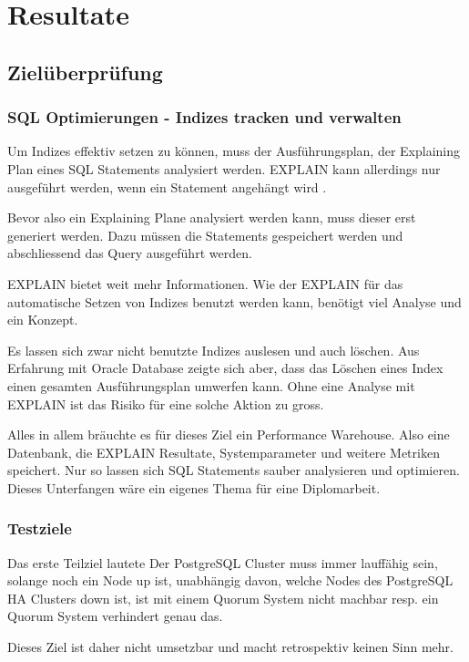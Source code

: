 
\clearpage
{}
\recalctypearea
\chapter{Resultate}
\section{Zielüberprüfung}

\clearpage
{}
\recalctypearea
\begin{flushleft}
    \subsection{SQL Optimierungen - Indizes tracken und verwalten}
    Um Indizes effektiv setzen zu können, muss der Ausführungsplan, der Explaining Plan eines SQL Statements analysiert werden.
    EXPLAIN kann allerdings nur ausgeführt werden, wenn ein Statement angehängt wird \cite{A4Y646W7}.
\end{flushleft}
\begin{flushleft}
    Bevor also ein Explaining Plane analysiert werden kann, muss dieser erst generiert werden.
    Dazu müssen die Statements gespeichert werden und abschliessend das Query ausgeführt werden.
\end{flushleft}
\begin{flushleft}
    EXPLAIN bietet weit mehr Informationen.
    Wie der EXPLAIN für das automatische Setzen von Indizes benutzt werden kann,
    benötigt viel Analyse und ein Konzept.
\end{flushleft}
\begin{flushleft}
    Es lassen sich zwar nicht benutzte Indizes auslesen und auch löschen.
    Aus Erfahrung mit \Gls{Oracle Database} zeigte sich aber, dass das Löschen eines Index einen gesamten Ausführungsplan umwerfen kann.
    Ohne eine Analyse mit EXPLAIN ist das Risiko für eine solche Aktion zu gross.
\end{flushleft}
\begin{flushleft}
    Alles in allem bräuchte es für dieses Ziel ein Performance Warehouse.
    Also eine Datenbank, die EXPLAIN Resultate, Systemparameter und weitere Metriken speichert.
    Nur so lassen sich SQL Statements sauber analysieren und optimieren.
    Dieses Unterfangen wäre ein eigenes Thema für eine Diplomarbeit.
    \subsection{Testziele}
    Das erste Teilziel lautete \guillemotleft Der PostgreSQL Cluster muss immer lauffähig sein, solange noch ein Node up ist, unabhängig davon, welche Nodes des PostgreSQL HA Clusters down ist\guillemotright,
    ist mit einem \Gls{Quorum} System nicht machbar resp. ein \Gls{Quorum} System verhindert genau das.
\end{flushleft}
\begin{flushleft}
    Dieses Ziel ist daher nicht umsetzbar und macht retrospektiv keinen Sinn mehr.
\end{flushleft}